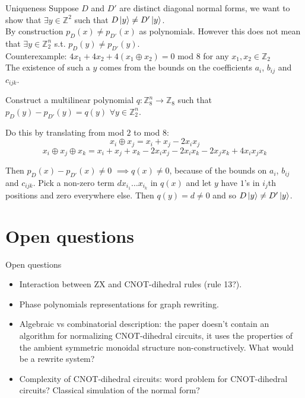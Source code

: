 \documentclass{beamer}
\theoremstyle{definition}
\begin{document}
\begin{frame}{Uniqueness}
Suppose $D$ and $D'$ are distinct diagonal normal forms, we want to show that $\exists y \in \mathbb{Z}^2$ such that $D\ket{y} \neq D'\ket{y}$.\\

By construction $p_D(x) \neq p_{D'}(x)$ as polynomials. However this does not mean that $\exists y \in \mathbb{Z}_2^n$ s.t. $p_D(y) \neq p_{D'}(y)$.\\

Counterexample: $4x_1 + 4x_2 + 4(x_1 \oplus x_2) = 0$ mod $8$ for any $x_1, x_2 \in \mathbb{Z}_2$\\

The existence of such a $y$ comes from the bounds on the coefficients $a_i$, $b_{ij}$ and $c_{ijk}$.

Construct a multilinear polynomial $q : \mathbb{Z}_8^n \rightarrow \mathbb{Z}_8$ such that $p_D(y)- p_{D'}(y) = q(y)$ $\forall y \in \mathbb{Z}_2^n$.

Do this by translating from mod $2$ to mod $8$:
$$ x_i \oplus x_j = x_i + x_j -2x_ix_j $$
$$ x_i \oplus x_j \oplus x_k = x_i + x_j + x_k -2x_ix_j -2x_ix_k -2x_jx_k + 4x_ix_jx_k$$

Then $p_D(x) - p_{D'}(x) \neq 0$ $\implies q(x) \neq 0$, because of the bounds on $a_i$, $b_{ij}$ and $c_{ijk}$. Pick a non-zero term $d x_{i_1} \dots x_{i_k}$ in $q(x)$ and let $y$ have $1$'s in $i_j$th positions and zero everywhere else. Then $q(y) = d \neq 0$ and so $D\ket{y} \neq D' \ket{y}$.
\end{frame}

\section{Open questions}
\begin{frame}{Open questions}
	\begin{itemize}
		\item Interaction between ZX and CNOT-dihedral rules (rule 13?).
		\item Phase polynomials representations for graph rewriting.
		\item Algebraic vs combinatorial description: the paper doesn't contain an algorithm for normalizing CNOT-dihedral circuits, it uses the properties of the ambient symmetric monoidal structure non-constructively. What would be a rewrite system?
		\item Complexity of CNOT-dihedral circuits: word problem for CNOT-dihedral circuits? Classical simulation of the normal form?
	\end{itemize}
\end{frame}
\end{document}
